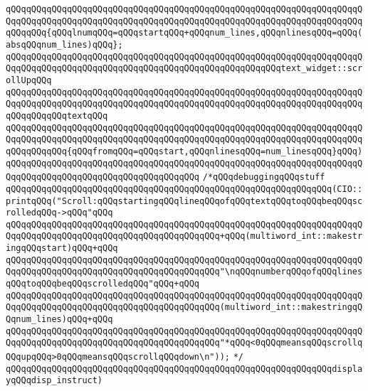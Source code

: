 \verb|qQQqqQQqqQQqqQQqqQQqqQQqqQQqqQQqqQQqqQQqqQQqqQQqqQQqqQQqqQQqqQQqqQQqqQQqqQQqqQQqqQQqqQQqqQQqqQQqqQQqqQQqqQQqqQQqqQQqqQQqqQQqqQQqqQQqqQQqqQQqqQQqqQQq{qQQqlnumqQQq=qQQqstartqQQq+qQQqnum_lines,qQQqnlinesqQQq=qQQq(absqQQqnum_lines)qQQq};|\newline
\verb|qQQqqQQqqQQqqQQqqQQqqQQqqQQqqQQqqQQqqQQqqQQqqQQqqQQqqQQqqQQqqQQqqQQqqQQqqQQqqQQqqQQqqQQqqQQqqQQqqQQqqQQqqQQqqQQqqQQqqQQqqQQqtext_widget::scrollUpqQQq|\newline
\verb|qQQqqQQqqQQqqQQqqQQqqQQqqQQqqQQqqQQqqQQqqQQqqQQqqQQqqQQqqQQqqQQqqQQqqQQqqQQqqQQqqQQqqQQqqQQqqQQqqQQqqQQqqQQqqQQqqQQqqQQqqQQqqQQqqQQqqQQqqQQqqQQqqQQqqQQqtextqQQq|\newline
\verb|qQQqqQQqqQQqqQQqqQQqqQQqqQQqqQQqqQQqqQQqqQQqqQQqqQQqqQQqqQQqqQQqqQQqqQQqqQQqqQQqqQQqqQQqqQQqqQQqqQQqqQQqqQQqqQQqqQQqqQQqqQQqqQQqqQQqqQQqqQQqqQQqqQQqqQQq{qQQqfromqQQq=qQQqstart,qQQqnlinesqQQq=num_linesqQQq}qQQq)|\newline
\verb|qQQqqQQqqQQqqQQqqQQqqQQqqQQqqQQqqQQqqQQqqQQqqQQqqQQqqQQqqQQqqQQqqQQqqQQqqQQqqQQqqQQqqQQqqQQqqQQqqQQqqQQqqQQq|\newline
\verb|/*qQQqdebuggingqQQqstuff|\newline
\verb|qQQqqQQqqQQqqQQqqQQqqQQqqQQqqQQqqQQqqQQqqQQqqQQqqQQqqQQqqQQqqQQq(CIO::printqQQq("Scroll:qQQqstartingqQQqlineqQQqofqQQqtextqQQqtoqQQqbeqQQqscrolledqQQq->qQQq"qQQq|\newline
\verb|qQQqqQQqqQQqqQQqqQQqqQQqqQQqqQQqqQQqqQQqqQQqqQQqqQQqqQQqqQQqqQQqqQQqqQQqqQQqqQQqqQQqqQQqqQQqqQQqqQQqqQQqqQQqqQQq+qQQq(multiword_int::makestringqQQqstart)qQQq+qQQq|\newline
\verb|qQQqqQQqqQQqqQQqqQQqqQQqqQQqqQQqqQQqqQQqqQQqqQQqqQQqqQQqqQQqqQQqqQQqqQQqqQQqqQQqqQQqqQQqqQQqqQQqqQQqqQQqqQQqqQQq"\nqQQqnumberqQQqofqQQqlinesqQQqtoqQQqbeqQQqscrolledqQQq"qQQq+qQQq|\newline
\verb|qQQqqQQqqQQqqQQqqQQqqQQqqQQqqQQqqQQqqQQqqQQqqQQqqQQqqQQqqQQqqQQqqQQqqQQqqQQqqQQqqQQqqQQqqQQqqQQqqQQqqQQqqQQqqQQq(multiword_int::makestringqQQqnum_lines)qQQq+qQQq|\newline
\verb|qQQqqQQqqQQqqQQqqQQqqQQqqQQqqQQqqQQqqQQqqQQqqQQqqQQqqQQqqQQqqQQqqQQqqQQqqQQqqQQqqQQqqQQqqQQqqQQqqQQqqQQqqQQqqQQq"*qQQq<0qQQqmeansqQQqscrollqQQqupqQQq>0qQQqmeansqQQqscrollqQQqdown\n"));|\newline
\verb|*/|\newline
\verb|qQQqqQQqqQQqqQQqqQQqqQQqqQQqqQQqqQQqqQQqqQQqqQQqqQQqqQQqqQQqqQQqdisplayqQQqdisp_instruct)|\newline
\newline
\newline
